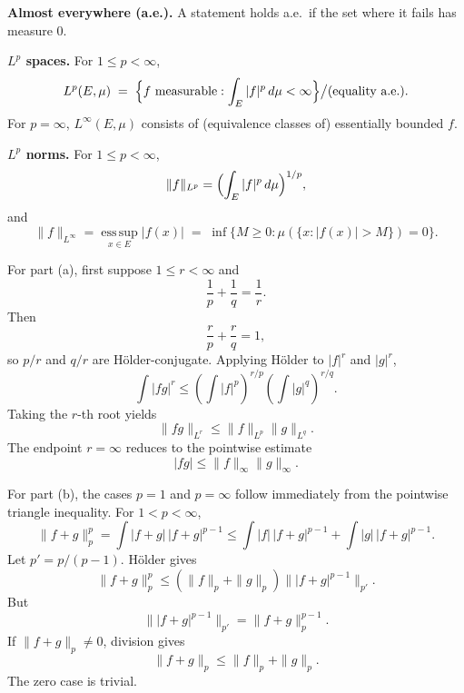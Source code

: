 \begin{problem}[CP-III-0003]
	\textbf{Almost everywhere (a.e.).}
	A statement holds a.e.\ if the set where it fails has measure $0$.

	\textbf{$L^{p}$ spaces.}
	For $1\le p<\infty$,
	\[
	L^{p}(E,\mu) \;=\; \Bigl\{ f \text{ measurable} : \int_E |f|^{p}\,d\mu < \infty \Bigr\}
	\big/ \text{(equality a.e.)}.
	\]
	For $p=\infty$, $L^\infty(E,\mu)$ consists of (equivalence classes of) essentially bounded $f$.

	\textbf{$L^{p}$ norms.}
	For $1\le p<\infty$,
	\[
	\|f\|_{L^{p}}=\Bigl(\int_E |f|^{p}\,d\mu\Bigr)^{1/p},
	\]
	and
	\[
	\|f\|_{L^{\infty}}=\operatorname*{ess\,sup}_{x\in E} |f(x)|
	\;=\; \inf\{ M\ge 0 : \mu(\{x:|f(x)|>M\})=0\}.
	\]
\end{problem}

\begin{solution}
For part (a), first suppose \(1\le r<\infty\) and
\[
\frac1p+\frac1q=\frac1r.
\]
Then
\[
\frac{r}{p}+\frac{r}{q}=1,
\]
so \(p/r\) and \(q/r\) are Hölder-conjugate.  Applying Hölder to
\(|f|^r\) and \(|g|^r\),
\[
\int |fg|^r
\le
\left(\int |f|^p\right)^{r/p}
\left(\int |g|^q\right)^{r/q}.
\]
Taking the \(r\)-th root yields
\[
\boxed{\|fg\|_{L^r}\le \|f\|_{L^p}\|g\|_{L^q}}.
\]
The endpoint \(r=\infty\) reduces to the pointwise estimate
\[
|fg|\le \|f\|_\infty\|g\|_\infty.
\]

For part (b), the cases \(p=1\) and \(p=\infty\) follow immediately from
the pointwise triangle inequality.  For \(1<p<\infty\),
\[
\|f+g\|_p^p
=
\int |f+g|\,|f+g|^{p-1}
\le
\int |f|\,|f+g|^{p-1}
+
\int |g|\,|f+g|^{p-1}.
\]
Let \(p'=p/(p-1)\).  Hölder gives
\[
\|f+g\|_p^p
\le
(\|f\|_p+\|g\|_p)
\bigl\||f+g|^{p-1}\bigr\|_{p'}.
\]
But
\[
\bigl\||f+g|^{p-1}\bigr\|_{p'}
=
\|f+g\|_p^{p-1}.
\]
If \(\|f+g\|_p\neq0\), division gives
\[
\boxed{\|f+g\|_p\le \|f\|_p+\|g\|_p}.
\]
The zero case is trivial.
\end{solution}


